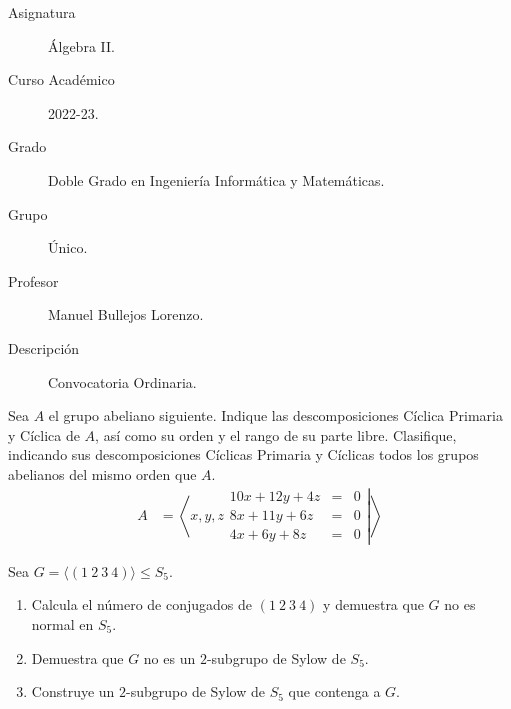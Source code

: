 \documentclass[12pt]{article}
\begin{document}

    
    

    \begin{description}
        \item[Asignatura] Álgebra II.
        \item[Curso Académico] 2022-23.
        \item[Grado] Doble Grado en Ingeniería Informática y Matemáticas.
        \item[Grupo] Único.
        \item[Profesor] Manuel Bullejos Lorenzo.
        \item[Descripción] Convocatoria Ordinaria.
    
    \end{description}
    \newpage


    \begin{ejercicio}
        Sea $A$ el grupo abeliano siguiente. Indique las descomposiciones Cíclica Primaria y Cíclica de $A$, así como su orden y el rango de su parte libre. Clasifique, indicando sus descomposiciones Cíclicas Primaria y Cíclicas todos los grupos abelianos del mismo orden que $A$.
        \begin{align*}
            A & = \left\langle x, y, z\left.\begin{array}{rcl}
                10x + 12y + 4z & = & 0 \\
                8x + 11y + 6z & = & 0 \\
                4x + 6y + 8z & = & 0
            \end{array}\right|\right\rangle
        \end{align*}
    \end{ejercicio}

    \begin{ejercicio}
        Sea $G=\langle (1\ 2\ 3\ 4)\rangle \leq S_5$.
        \begin{enumerate}
            \item Calcula el número de conjugados de $(1\ 2\ 3\ 4)$ y demuestra que $G$ no es normal en $S_5$.
            \item Demuestra que $G$ no es un $2$-subgrupo de Sylow de $S_5$.
            \item Construye un $2$-subgrupo de Sylow de $S_5$ que contenga a $G$.
        \end{enumerate}
    \end{ejercicio}
\end{document}
